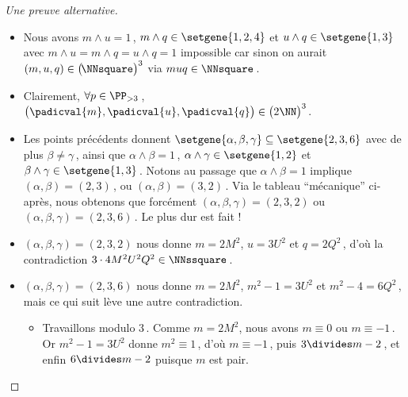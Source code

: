 \begin{proof}[Une preuve alternative]
\begin{itemize}
		\item Nous avons $m \wedge u = 1$\,, $m \wedge q \in \setgene{1, 2, 4}$ et $u \wedge q \in \setgene{1, 3}$
		avec $m \wedge u = m \wedge q = u \wedge q = 1$ impossible car sinon on aurait $(m, u, q) \in \big( \kern-1.5pt\NNsquare \big)^3$ via $muq \in \NNsquare$\,.


		\item Clairement, $\forall p \in \PP_{>3}$\,, $\big( \padicval{m} , \padicval{u} , \padicval{q} \big) \in \big( 2 \NN \big)^3$.


		\item Les points précédents donnent 
		$\setgene{\alpha, \beta, \gamma} \subseteq \setgene{2, 3, 6}$
		avec de plus
		$\beta \neq \gamma$\,,
		ainsi que 
		$\alpha \wedge \beta = 1$\,, $\alpha \wedge \gamma \in \setgene{1, 2}$ et $\beta \wedge \gamma \in \setgene{1, 3}$\,.
		Notons au passage que $\alpha \wedge \beta = 1$ implique $(\alpha, \beta) = (2, 3)$\,, ou $(\alpha, \beta) = (3, 2)$\,.
		Via le tableau \enquote{mécanique} ci-après, nous obtenons que forcément $(\alpha, \beta, \gamma) = (2, 3, 2)$ ou $(\alpha, \beta, \gamma) = (2, 3, 6)$\,. Le plus dur est fait !
	\end{itemize}

	\begin{center}
	\end{center}


	\begin{itemize}
		\item $(\alpha, \beta, \gamma) = (2, 3, 2)$ nous donne $m = 2 M^2$, $u = 3 U^2$ et $q = 2 Q^2$\,, d'où la contradiction $3 \cdot4 M^2 U^2 Q^2 \in \NNssquare$\,.


		\item $(\alpha, \beta, \gamma) = (2, 3, 6)$ nous donne $m = 2 M^2$, $m^2 - 1 = 3 U^2$ et $m^2 - 4 = 6 Q^2$\,, mais ce qui suit lève une autre contradiction.
		\begin{itemize}
			\item Travaillons modulo $3$\,.
			Comme $m = 2 M^2$, nous avons $m \equiv 0$ ou $m \equiv -1$\,. 
			Or $m^2 - 1 = 3 U^2$ donne $m^2 \equiv 1$\,, d'où $m \equiv -1$\,, puis $3 \divides m - 2$\,, et enfin $6 \divides m - 2$ puisque $m$ est pair.
			

\end{itemize}
\end{itemize}
\end{proof}
